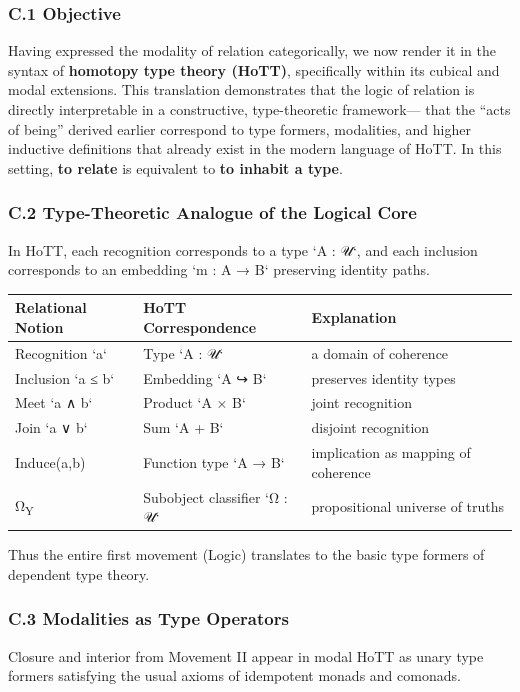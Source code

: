 \documentclass[11pt]{article}
\begin{document}
\subsubsection*{C.1 Objective}
\label{sec:org11e5448}
Having expressed the modality of relation categorically,  
we now render it in the syntax of \textbf{homotopy type theory (HoTT)},  
specifically within its cubical and modal extensions.  
This translation demonstrates that the logic of relation  
is directly interpretable in a constructive, type-theoretic framework—  
that the “acts of being” derived earlier correspond to type formers, modalities,  
and higher inductive definitions that already exist in the modern language of HoTT.  
In this setting, \textbf{to relate} is equivalent to \textbf{to inhabit a type}.
\subsubsection*{C.2 Type-Theoretic Analogue of the Logical Core}
\label{sec:orgbe6c850}
In HoTT, each recognition corresponds to a type `A : 𝒰`,  
and each inclusion corresponds to an embedding `m : A → B` preserving identity paths.

\begin{center}
\begin{tabular}{lll}
Relational Notion & HoTT Correspondence & Explanation\\
\hline
Recognition `a` & Type `A : 𝒰` & a domain of coherence\\
Inclusion `a ≤ b` & Embedding `A ↪ B` & preserves identity types\\
Meet `a ∧ b` & Product `A × B` & joint recognition\\
Join `a ∨ b` & Sum `A + B` & disjoint recognition\\
Induce(a,b) & Function type `A → B` & implication as mapping of coherence\\
Ω\textsubscript{Y} & Subobject classifier `Ω : 𝒰` & propositional universe of truths\\
\end{tabular}
\end{center}

Thus the entire first movement (Logic)  
translates to the basic type formers of dependent type theory.
\subsubsection*{C.3 Modalities as Type Operators}
\label{sec:org155defa}
Closure and interior from Movement II appear in modal HoTT as unary type formers  
satisfying the usual axioms of idempotent monads and comonads.
\end{document}
